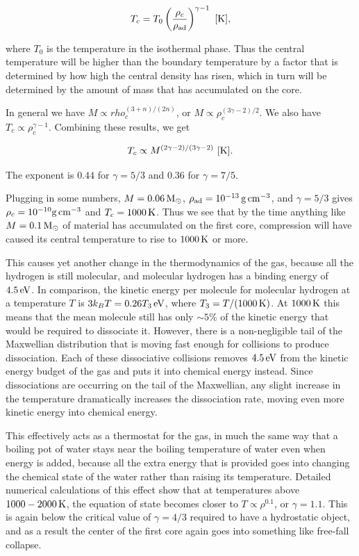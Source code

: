 \documentclass[a4paper,10pt]{article}
\begin{document}
\begin{align*}
    T_c = T_0 \left(\frac{\rho_c}{\rho_{\rm ad}}\right) ^{\gamma-1} ~ [{\rm K}],
\end{align*}

{\noindent}where $T_0$ is the temperature in the isothermal phase. Thus the central temperature will be higher than the boundary temperature by a factor that is determined by how high the central density has risen, which in turn will be determined by the amount of mass that has accumulated on the core.

{\noindent}In general we have $M\propto
rho_c^{(3+n)/(2n)}$, or $M\propto\rho_c^{(3\gamma-2)/2}$. We also have $T_c\propto\rho_c^{\gamma-1}$. Combining these results, we get

\begin{align*}
    T_c \propto M^{(2\gamma-2)/(3\gamma-2)} ~ [{\rm K}].
\end{align*}

{\noindent}The exponent is $0.44$ for $\gamma=5/3$ and $0.36$ for $\gamma=7/5$.

{\noindent}Plugging in some numbers, $M=0.06\,{\rm M_\odot}$, $\rho_{\rm ad}=10^{-13}\,{\rm g\,cm^{-3}}$, and $\gamma=5/3$ gives $\rho_c=10^{-10}{\rm g\,cm^{-3}}$ and $T_c=1000\,{\rm K}$. Thus we see that by the time anything like $M=0.1\,{\rm M_\odot}$ of material has accumulated on the first core, compression will have caused its central temperature to rise to $1000\,{\rm K}$ or more.

{\noindent}This causes yet another change in the thermodynamics of the gas, because all the hydrogen is still molecular, and molecular hydrogen has a binding energy of $4.5\,{\rm eV}$. In comparison, the kinetic energy per molecule for molecular hydrogen at a temperature $T$ is $3k_BT=0.26T_3\,{\rm eV}$, where $T_3=T/(1000\,{\rm K})$. At $1000\,{\rm K}$ this means that the mean molecule still has only $\sim5\%$ of the kinetic energy that would be required to dissociate it. However, there is a non-negligible tail of the Maxwellian distribution that is moving fast enough for collisions to produce dissociation. Each of these dissociative collisions removes $4.5\,{\rm eV}$ from the kinetic energy budget of the gas and puts it into chemical energy instead. Since dissociations are occurring on the tail of the Maxwellian, any slight increase in the temperature dramatically increases the dissociation rate, moving even more kinetic energy into chemical energy.

{\noindent}This effectively acts as a thermostat for the gas, in much the same way that a boiling pot of water stays near the boiling temperature of water even when energy is added, because all the extra energy that is provided goes into changing the chemical state of the water rather than raising its temperature. Detailed numerical calculations of this effect show that at temperatures above $1000-2000\,{\rm K}$, the equation of state becomes closer to $T\propto\rho^{0.1}$, or $\gamma=1.1$. This is again below the critical value of $\gamma=4/3$ required to have a hydrostatic object, and as a result the center of the first core again goes into something like free-fall collapse.
\end{document}
